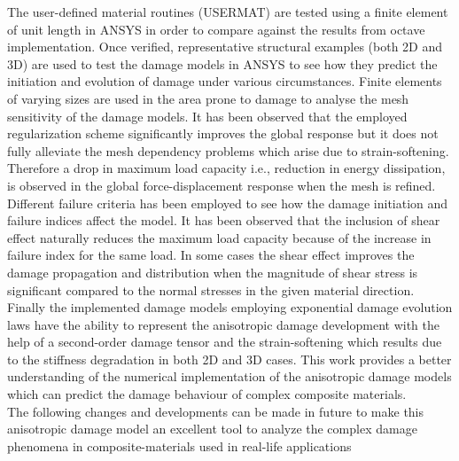 \documentclass[12pt,openright,twoside]{report}
\begin{document}
\indent\indent\indent The user-defined material routines (USERMAT) are tested using a finite element of unit length in ANSYS in order to compare against the results from octave implementation. Once verified, representative structural examples (both 2D and 3D) are used to test the damage models in ANSYS to see how they predict the initiation and evolution of damage under various circumstances. Finite elements of varying sizes are used in the area prone to damage to analyse the mesh sensitivity of the damage models. It has been observed that the employed regularization scheme  significantly improves the global response but it does not fully alleviate the mesh dependency problems which arise due to strain-softening. Therefore a drop in maximum load capacity i.e., reduction in energy dissipation, is observed in the global force-displacement response when the mesh is refined. Different failure criteria has been employed to see how the damage initiation and failure indices affect the model. It has been observed that the inclusion of shear effect naturally reduces the maximum load capacity because of the increase in failure index for the same load. In some cases the shear effect improves the damage propagation and distribution when the magnitude of shear stress is significant compared to the normal stresses in the given material direction. Finally the implemented damage models employing exponential damage evolution laws have the ability to represent the anisotropic damage development with the help of a second-order damage tensor and the strain-softening which results due to the stiffness degradation in both 2D and 3D cases. This work provides a better understanding of the numerical implementation of the anisotropic damage models which can predict the damage behaviour of complex composite materials.\\

The following changes and developments can be made in future to make this anisotropic damage model an excellent tool to analyze the complex damage phenomena in composite-materials used in real-life applications
\end{document}
